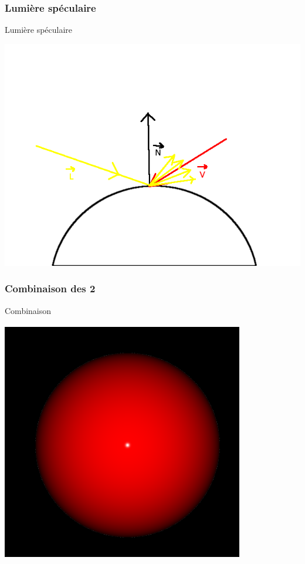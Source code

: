 \begin{frame}
	\frametitle{Lumière spéculaire}
	\begin{block}{Lumière spéculaire}
	\begin{center}
		\includegraphics[scale=0.35]{phong2.png} 	
	\end{center}
	\end{block}
\end{frame}

\begin{frame}
	\frametitle{Combinaison des 2}
	\begin{block}{Combinaison}
	\begin{center}
		\includegraphics[scale=0.35]{phong3.png} 	
	\end{center}
	\end{block}
\end{frame}

